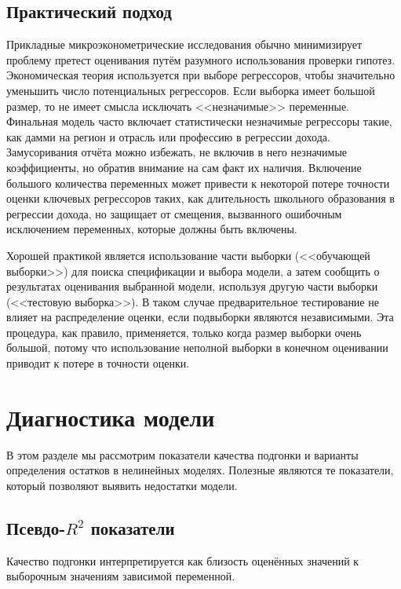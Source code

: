 \subsection{Практический подход}

Прикладные микроэконометрические исследования обычно минимизирует проблему претест оценивания путём разумного использования проверки гипотез. Экономическая теория используется при выборе регрессоров, чтобы значительно уменьшить число потенциальных регрессоров. Если выборка имеет большой размер, то не имеет смысла исключать <<незначимые>> переменные. Финальная модель часто включает статистически незначимые регрессоры такие, как дамми на регион и отрасль  или профессию в регрессии дохода. Замусоривания отчёта можно избежать, не включив в него незначимые коэффициенты, но обратив внимание на сам факт их наличия.  Включение большого количества переменных может привести к некоторой потере точности оценки ключевых регрессоров таких, как длительность школьного образования в регрессии дохода, но защищает от смещения, вызванного ошибочным исключением переменных, которые должны быть включены.

Хорошей практикой является использование части выборки (<<обучающей выборки>>) для поиска спецификации и выбора модели, а затем сообщить о результатах оценивания выбранной модели, используя другую части выборки (<<тестовую выборка>>). В таком случае предварительное тестирование не влияет на распределение оценки, если подвыборки являются независимыми. Эта процедура, как правило, применяется, только когда размер выборки очень большой, потому что использование неполной выборки в конечном оценивании приводит к потере в точности оценки.

\section{Диагностика модели}

В этом разделе мы рассмотрим показатели качества подгонки и варианты определения остатков в нелинейных моделях. Полезные являются те показатели, который позволяют выявить недостатки модели.

\subsection{Псевдо-$R^2$ показатели}

Качество подгонки интерпретируется как близость оценённых значений к выборочным значениям зависимой переменной. 

